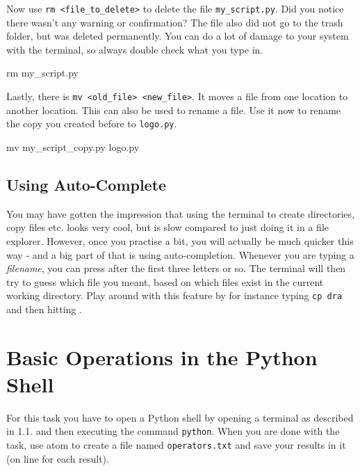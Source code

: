 \noindent Now use \texttt{rm <file\_to\_delete>} to delete the file \texttt{my\_script.py}. Did you notice there wasn't any warning or confirmation? The file also did not go to the trash folder, but was deleted permanently. You can do a lot of damage to your system with the terminal, so always double check what you type in.

\vspace{1em}

\begin{solution}
    \begin{outputcode}
rm my_script.py
    \end{outputcode}
\end{solution}

\noindent Lastly, there is \texttt{mv <old\_file> <new\_file>}. It moves a file from one location to another location. This can also be used to rename a file. Use it now to rename the copy you created before to \texttt{logo.py}.

\vspace{1em}

\begin{solution}
    \begin{outputcode}
mv my_script_copy.py logo.py
    \end{outputcode}
\end{solution}

\subsection{Using Auto-Complete}

You may have gotten the impression that using the terminal to create directories, copy files etc. looks very cool, but is slow compared to just doing it in a file explorer. However, once you practise a bit, you will actually be much quicker this way - and a big part of that is using auto-completion. Whenever you are typing a \textit{filename}, you can press \keys{\tab} after the first three letters or so. The terminal will then try to guess which file you meant, based on which files exist in the current working directory. Play around with this feature by for instance typing \texttt{cp dra} and then hitting \keys{\tab}.


\section{Basic Operations in the Python Shell}

For this task you have to open a Python shell by opening a terminal as described in 1.1. and then executing the command \texttt{python}. When you are done with the task, use atom to create a file named \texttt{operators.txt} and save your results in it (on line for each result).

